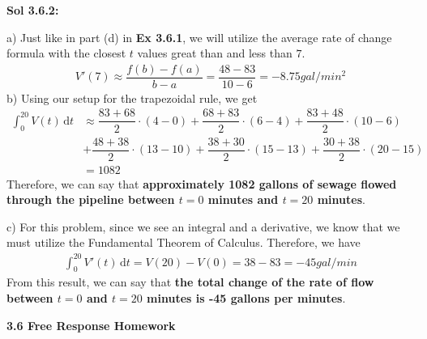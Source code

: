 \begin{tcolorbox}[solution]
    \textbf{Sol 3.6.2: } \par
    a) Just like in part (d) in \textbf{Ex 3.6.1}, we will utilize the average rate of change formula with the closest $t$ values great than and less than $7$. \begin{align*}
        V'(7) \approx \dfrac{f(b) - f(a)}{b - a} = \dfrac{48 - 83}{10 - 6} = \boxed{-8.75 \si{gal \per min^2}}
    \end{align*}
    b) Using our setup for the trapezoidal rule, we get \begin{align*}
        \int_0^{20} V(t) \,\mathrm{d}t &\approx \dfrac{83 + 68}{2} \cdot (4 - 0) + \dfrac{68 + 83}{2} \cdot (6 - 4) + \dfrac{83 + 48}{2} \cdot (10 - 6) \\[5.5pt]
        & + \dfrac{48 + 38}{2} \cdot (13 - 10) + \dfrac{38 + 30}{2} \cdot (15 - 13) + \dfrac{30 + 38}{2} \cdot (20 - 15) \\[11pt]
        & = 1082
    \end{align*}
    Therefore, we can say that \textbf{approximately 1082 gallons of sewage flowed through the pipeline between $t = 0$ minutes and $t = 20$ minutes}. \par
    \vspace{11pt}
    c) For this problem, since we see an integral and a derivative, we know that we must utilize the Fundamental Theorem of Calculus. Therefore, we have \begin{align*}
        \int_0^{20} V'(t) \,\mathrm{d}t = V(20) - V(0) = 38 - 83 = -45 \si{gal \per min}
    \end{align*}
    From this result, we can say that \textbf{the total change of the rate of flow between $t = 0$ and $t = 20$ minutes is -45 gallons per minutes}.
\end{tcolorbox}

\newpage

\textbf{\large{3.6 Free Response Homework}} \par

